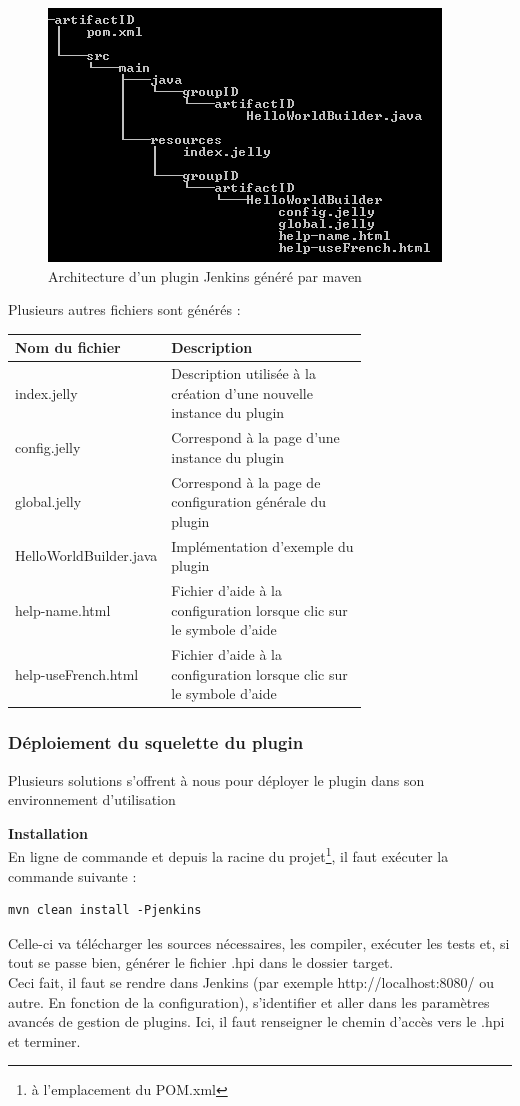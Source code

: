 \begin{figure}[h]
  \centering
      \includegraphics{images/hpiCreate.png}
  \caption{Architecture d'un plugin Jenkins généré par maven}
	\label{figure:hpiCreate}
\end{figure}


Plusieurs autres fichiers sont générés :

\begin{tabular}{|l|p{0.7\linewidth}|}
  \hline
  \textbf{Nom du fichier} & \textbf{Description} \\
  \hline
  index.jelly & Description utilisée à la création d'une nouvelle instance du plugin \\
  config.jelly & Correspond à la page d'une instance du plugin \\
  global.jelly & Correspond à la page de configuration générale du plugin \\
  HelloWorldBuilder.java & Implémentation d'exemple du plugin \\
  help-name.html & Fichier d'aide à la configuration lorsque clic sur le symbole d'aide \\
  help-useFrench.html & Fichier d'aide à la configuration lorsque clic sur le symbole d'aide \\
  \hline
\end{tabular}


\subsubsection{Déploiement du squelette du plugin}
Plusieurs solutions s'offrent à nous pour déployer le plugin dans son environnement d'utilisation

\textbf{Installation }\hfill \\ \indent 
En ligne de commande et depuis la racine du projet\footnote{\`{a} l'emplacement du POM.xml}, il faut exécuter la commande suivante :
\begin{lstlisting}
mvn clean install -Pjenkins
\end{lstlisting}
Celle-ci va télécharger les sources nécessaires, les compiler, exécuter les tests et, si tout se passe bien, générer le fichier .hpi dans le dossier target.\\
Ceci fait, il faut se rendre dans Jenkins (par exemple http://localhost:8080/ ou autre. En fonction de la configuration), s'identifier et aller dans les paramètres avancés de gestion de plugins. Ici, il faut renseigner le chemin d'accès vers le .hpi et terminer.\\


